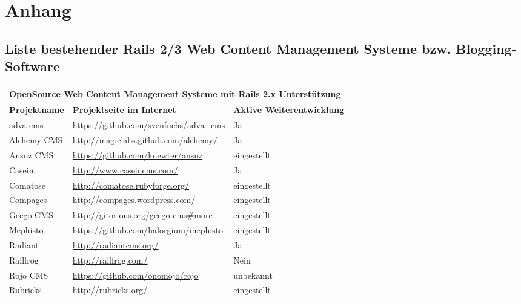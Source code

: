 \chapter{Anhang}
\section{Liste bestehender Rails 2/3 Web Content Management Systeme bzw. Blogging-Software}
\begin{table}[!ht]
\center
\begin{tabular}[]{|p{3cm}|p{8cm}|p{4cm}|}
\hline
\multicolumn{3}{|p{15cm}|}{\textbf{OpenSource Web Content Management Systeme mit Rails 2.x Unterstützung}}\\
\hline
\textbf{Projektname}&\textbf{Projektseite im Internet}&\textbf{Aktive Weiterentwicklung}\\
\hline
adva-cms & \href{https://github.com/svenfuchs/adva\_cms}{https://github.com/svenfuchs/adva\_cms} & Ja \\
\hline
\cellcolor{alicegrey} Alchemy CMS & \cellcolor{alicegrey} \href{http://magiclabs.github.com/alchemy/}{http://magiclabs.github.com/alchemy/} & \cellcolor{alicegrey} Ja \\
\hline
Ansuz CMS & \href{https://github.com/knewter/ansuz}{https://github.com/knewter/ansuz} & eingestellt\\
\hline
Casein & \href{http://www.caseincms.com/}{http://www.caseincms.com/} & Ja \\
\hline
Comatose & \href{http://comatose.rubyforge.org/}{http://comatose.rubyforge.org/} & eingestellt\\
\hline
Compages & \href{http://compages.wordpress.com/}{http://compages.wordpress.com/} & eingestellt\\
\hline
Geego CMS & \href{http://gitorious.org/geego-cms\#more}{http://gitorious.org/geego-cms\#more} & eingestellt\\
\hline
Mephisto & \href{https://github.com/halorgium/mephisto}{https://github.com/halorgium/mephisto} & eingestellt\\
\hline
Radiant & \href{http://radiantcms.org/}{http://radiantcms.org/} & Ja \\
\hline
Railfrog & \href{http://railfrog.com/}{http://railfrog.com/} & Nein \\
\hline
Rojo CMS & \href{https://github.com/onomojo/rojo}{https://github.com/onomojo/rojo} & unbekannt\\
\hline
Rubricks & \href{http://rubricks.org/}{http://rubricks.org/} & eingestellt\\

\end{tabular}
\end{table}
